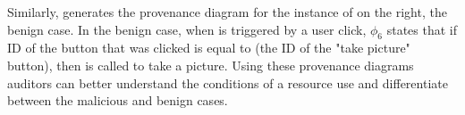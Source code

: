 Similarly, \hogarth{} generates the provenance diagram for the instance of 
 on the right, the benign case.  In the 
benign case, when  is triggered by a user click, $\phi_6$ 
states that if ID of the button that was clicked is equal to 
(the ID of the "take picture" button), then 
is called to take a picture.  Using these provenance diagrams auditors can 
better understand the conditions of a resource use and differentiate 
between the malicious and benign cases.




